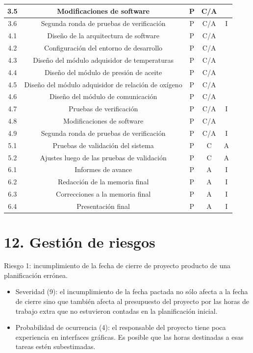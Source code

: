 \documentclass[11pt]{charter}
\begin{document}
\begin{table}[htpb]
{\begin{tabular}{@{}|c|c|c|c|c|@{}}
 3.5 & Modificaciones de software								 & P  & C/A &  \\ \hline
 3.6 & Segunda ronda de pruebas de verificación				 & P  & C/A & I  \\ \hline
 4.1 & Diseño de la arquitectura de software					 & P  & C/A &  \\ \hline
 4.2 & Configuración del entorno de desarrollo					 & P  & C/A &  \\ \hline
 4.3 & Diseño del módulo adquisidor de temperaturas			 & P  & C/A &  \\ \hline
 4.4 & Diseño del módulo de presión de aceite					 & P  & C/A &  \\ \hline
 4.5 & Diseño del módulo adquisidor de relación de oxígeno		 & P  & C/A &  \\ \hline
 4.6 & Diseño del módulo de comunicación						 & P  & C/A &  \\ \hline
 4.7 & Pruebas de verificación									 & P  & C/A & I  \\ \hline
 4.8 & Modificaciones de software								 & P  & C/A &  \\ \hline
 4.9 & Segunda ronda de pruebas de verificación				 & P  & C/A & I  \\ \hline
 5.1 & Pruebas de validación del sistema			             & P  & C & A \\ \hline
 5.2 & Ajustes luego de las pruebas de validación				 & P  & C & A \\ \hline
 6.1 & Informes de avance  										 & P  & A & I  \\ \hline
 6.2 & Redacción de la memoria final				 			 & P  & A & I \\ \hline
 6.3 & Correcciones a la memoria final 							 & P  & A & I  \\ \hline
 6.4 & Presentación final  										 & P  & A & I  \\ \hline
\end{tabular}%
}
\end{table}

\section{12. Gestión de riesgos}
\label{sec:riesgos}

Riesgo 1: incumplimiento de la fecha de cierre de proyecto producto de una planificación errónea.
\begin{itemize}
\item Severidad (9): el incumplimiento de la fecha pactada no sólo afecta a la fecha de cierre sino que también afecta al presupuesto del proyecto por las horas de trabajo extra que no estuvieron contadas en la planificación inicial.
\item Probabilidad de ocurrencia (4): el responsable del proyecto tiene poca experiencia en interfaces gráficas. Es posible que las horas destinadas a esas tareas estén subestimadas.
\end{itemize}  
\end{document}
